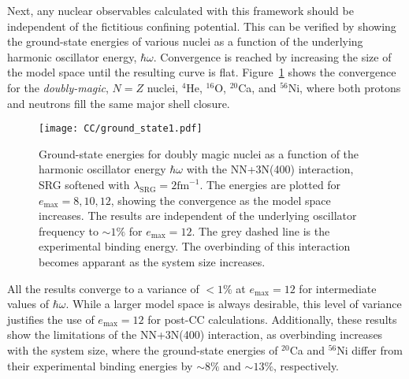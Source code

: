 \documentclass[thesis.tex]{subfiles}
\begin{document}
Next, any nuclear observables calculated with this framework should be independent of the fictitious confining potential.  This can be verified by showing the ground-state energies of various nuclei as a function of the underlying harmonic oscillator energy, $\hbar\omega$.  Convergence is reached by increasing the size of the model space until the resulting curve is flat.  Figure\ \ref{fig:Ground_State1} shows the convergence for the \textit{doubly-magic}, $N=Z$ nuclei, ${}^{4}$He, ${}^{16}$O, ${}^{20}$Ca, and ${}^{56}$Ni, where both protons and neutrons fill the same major shell closure.
\begin{figure}[h!]
  \centering
  \texttt{[image: CC/ground\_state1.pdf]}
  \caption{Ground-state energies for doubly magic nuclei as a function of the harmonic oscillator energy $\hbar\omega$ with the NN+3N(400) interaction, SRG softened with $\lambda_{\mathrm{SRG}}=2\mathrm{fm}^{-1}$.  The energies are plotted for $e_\mathrm{max}=8,10,12$, showing the convergence as the model space increases.  The results are independent of the underlying oscillator frequency to $\sim 1\%$ for $e_\mathrm{max}=12$.  The grey dashed line is the experimental binding energy.  The overbinding of this interaction becomes apparant as the system size increases.}
  \label{fig:Ground_State1}
\end{figure}
All the results converge to a variance of $<1\%$ at $e_{\mathrm{max}}=12$ for intermediate values of $\hbar\omega$.  While a larger model space is always desirable, this level of variance justifies the use of $e_{\mathrm{max}}=12$ for post-CC calculations.  Additionally, these results show the limitations of the NN+3N(400) interaction, as overbinding increases with the system size, where the ground-state energies of ${}^{20}$Ca and ${}^{56}$Ni differ from their experimental binding energies by $\sim 8\%$ and $\sim 13\%$, respectively.
\end{document}
